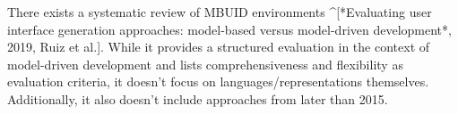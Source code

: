 There exists a systematic review of MBUID environments ^[*Evaluating user interface generation approaches: model-based versus model-driven development*, 2019, Ruiz et al.].
While it provides a structured evaluation in the context of model-driven development and lists comprehensiveness and flexibility as evaluation criteria, it doesn’t focus on languages/representations themselves.
Additionally, it also doesn’t include approaches from later than 2015.
